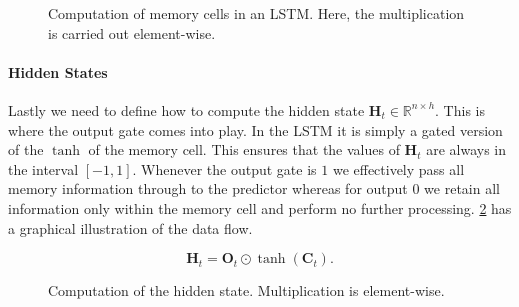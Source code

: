 \begin{figure}[hpt]
	\centering
	
	\caption{Computation of memory cells in an LSTM. Here, the multiplication is carried out element-wise.}
	\label{fig:lstm_2}
\end{figure}

\paragraph{Hidden States}

Lastly we need to define how to compute the hidden state $\mathbf{H}_t \in \mathbb{R}^{n \times h}$. This is where the output gate comes into play. In the LSTM it is simply a gated version of the $\tanh$ of the memory cell. This ensures that the values of $\mathbf{H}_t$ are always in the interval $[-1, 1]$. Whenever the output gate is $1$ we effectively pass all memory information through to the predictor whereas for output $0$ we retain all information only within the memory cell and perform no further processing. \cref{fig:lstm_3} has a graphical illustration of the data flow.

$$\mathbf{H}_t = \mathbf{O}_t \odot \tanh(\mathbf{C}_t).$$

\begin{figure}[hpt]
	\centering
	
	\caption{Computation of the hidden state. Multiplication is element-wise.}
	\label{fig:lstm_3}
\end{figure}



